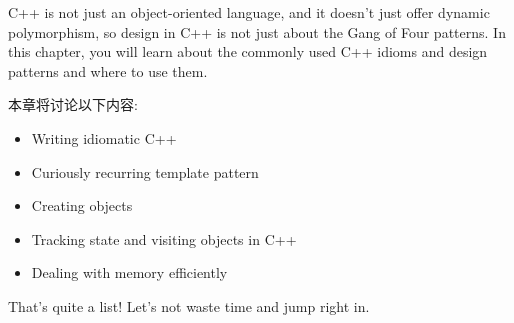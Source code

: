 
C++ is not just an object-oriented language, and it doesn't just offer dynamic polymorphism,
so design in C++ is not just about the Gang of Four patterns. In this chapter, you will learn
about the commonly used C++ idioms and design patterns and where to use them.

本章将讨论以下内容:

\begin{itemize}
\item Writing idiomatic C++
\item Curiously recurring template pattern
\item Creating objects
\item Tracking state and visiting objects in C++
\item Dealing with memory efficiently
\end{itemize}

That's quite a list! Let's not waste time and jump right in.